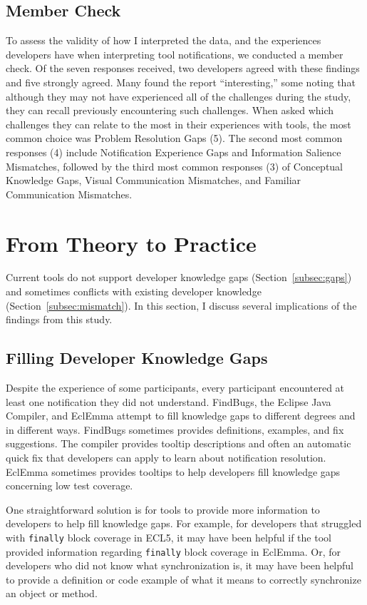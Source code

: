 \subsection{Member Check}
To assess the validity of how I interpreted the data, and the experiences developers have when interpreting tool notifications, we conducted a member check. Of the seven responses received, two developers agreed with these findings and five strongly agreed. Many found the report ``interesting,'' some noting that although they may not have experienced all of the challenges during the study, they can recall previously encountering such challenges. When asked which challenges they can relate to the most in their experiences with tools, the most common choice was Problem Resolution Gaps (5). The second most common responses (4) include Notification Experience Gaps and Information Salience Mismatches, followed by the third most common responses (3) of Conceptual Knowledge Gaps, Visual Communication Mismatches, and Familiar Communication Mismatches.

\section{From Theory to Practice}
Current tools do not support developer knowledge gaps (Section~\ref{subsec:gaps}) and sometimes conflicts with existing developer knowledge (Section~\ref{subsec:mismatch}).
In this section, I discuss several implications of the findings from this study.

\subsection{Filling Developer Knowledge Gaps}
Despite the experience of some participants, every participant encountered at least one notification they did not understand. 
FindBugs, the Eclipse Java Compiler, and EclEmma attempt to fill knowledge gaps to different degrees and in different ways. FindBugs sometimes provides definitions, examples, and fix suggestions. The compiler provides tooltip descriptions and often an automatic quick fix that developers can apply to learn about notification resolution. EclEmma sometimes provides tooltips to help developers fill knowledge gaps concerning low test coverage.

One straightforward solution is for tools to provide more information to developers to help fill knowledge gaps. For example, for developers that struggled with \texttt{finally} block coverage in ECL5, it may have been helpful if the tool provided information regarding \texttt{finally} block coverage in EclEmma. Or, for developers who did not know what synchronization is, it may have been helpful to provide a definition or code example of what it means to correctly synchronize an object or method.

